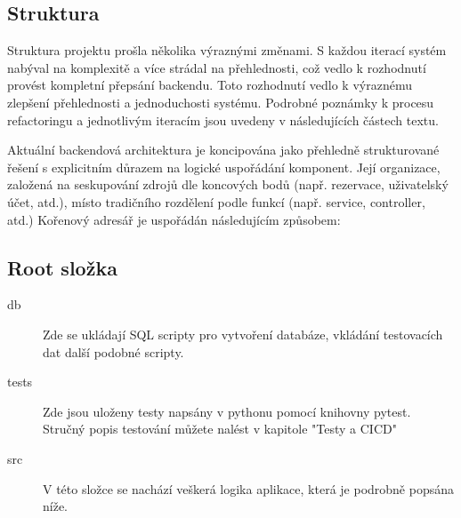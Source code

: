 
\subsection{Struktura}
Struktura projektu prošla několika výraznými změnami. S každou iterací systém nabýval na komplexitě a více strádal na přehlednosti, což vedlo k rozhodnutí provést kompletní přepsání backendu. Toto rozhodnutí vedlo k výraznému zlepšení přehlednosti a jednoduchosti systému. Podrobné poznámky k procesu refactoringu a jednotlivým iteracím jsou uvedeny v následujících částech textu.

Aktuální backendová architektura je koncipována jako přehledně strukturované řešení s explicitním důrazem na logické uspořádání komponent. Její organizace, založená na seskupování zdrojů dle koncových bodů (např. rezervace, uživatelský účet, atd.), místo tradičního rozdělení podle funkcí (např. service, controller, atd.)
Kořenový adresář je uspořádán následujícím způsobem:

\subsection{Root složka}
\begin{description}
    \item[db] 
    Zde se ukládají SQL scripty pro vytvoření databáze, vkládání testovacích dat další podobné scripty.
    \item[tests]  
    Zde jsou uloženy testy napsány v pythonu pomocí knihovny pytest. Stručný popis testování můžete nalést v kapitole "Testy a CICD"
    \item[src] 
    V této složce se nachází veškerá logika aplikace, která je podrobně popsána níže.
\end{description}

